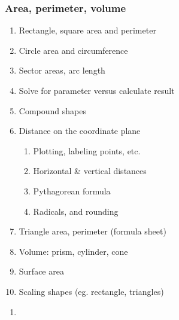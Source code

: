 \documentclass[12pt, oneside]{article}
\begin{document}
\subsubsection*{Area, perimeter, volume}
  \begin{enumerate}
  \item Rectangle, square area and perimeter
  \item Circle area and circumference
  \item Sector areas, arc length
  \item Solve for parameter versus calculate result
  \item Compound shapes
  \item Distance on the coordinate plane
  \begin{enumerate}
    \item Plotting, labeling points, etc.
    \item Horizontal \& vertical distances
    \item Pythagorean formula
    \item Radicals, \pi and rounding
    \end{enumerate}
  \item Triangle area, perimeter (formula sheet)
  \item Volume: prism, cylinder, cone
  \item Surface area
  \item Scaling shapes (eg. rectangle, triangles)
  \end{enumerate}

  \begin{enumerate}
    \subsubsection*{Basic shapes}
    \item


  \end{enumerate}
\end{document}
